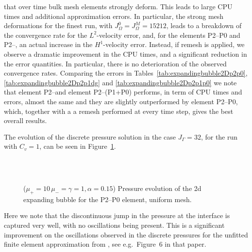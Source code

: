 that over time bulk mesh elements strongly deform. This leads to large CPU
times and additional approximation errors. In particular, the strong mesh
deformations for the finest run, with $J_\Omega^0 = J_\Omega^M = 15212$, leads
to a breakdown of the convergence rate for the $L^2$-velocity error, and, for
the elements P2--P0 and P2--\pdg, an actual increase in the $H^1$-velocity
error. Instead, if remesh is applied, we observe a dramatic improvement in the
CPU times, and a significant reduction in the error quantities. In particular,
there is no deterioration of the observed convergence rates. Comparing the
errors in Tables~\ref{tab:expandingbubble2Dp2p0},
\ref{tab:expandingbubble2Dp2p1dg} and \ref{tab:expandingbubble2Dp2p1p0} we note
that element P2--\pdg and element P2--(P1+P0) performs, in term of CPU times
and errors, almost the same and they are slightly outperformed by element
P2--P0, which, together with a a remesh performed at every time step, gives the
best overall results.

The evolution of the discrete pressure solution in the case $J_\Gamma = 32$,
for the run with $C_v = 1$, can be seen in
Figure~\ref{fig:expanding_bubble_uniform}.
\begin{figure}[htbp]
\centering
{}\\
\\
\caption[Stokes expanding bubble pressure uniform mesh]
{($\mu_+ = 10\,\mu_- = \gamma = 1,\alpha = 0.15$) Pressure evolution of
the 2d expanding bubble for the P2--P0 element, uniform mesh.}
\label{fig:expanding_bubble_uniform}
\end{figure}
Here we note that the discontinuous jump in the pressure at the interface is
captured very well, with no oscillations being present. This is a significant
improvement on the oscillations observed in the discrete pressures for the
unfitted finite element approximation from \cite{spurious}, see e.g.\
Figure~6 in that paper.

